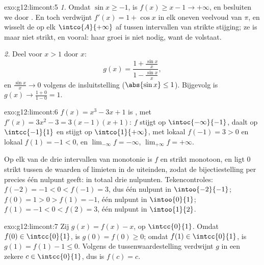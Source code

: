 \begin{solution}{exo:g12:limcont:5}
\emph{1.} Omdat $\sin x \geq -1$, is $f(x) \geq x - 1 \to +\infty$, en
besluiten we door . En toch verdwijnt $f'(x) = 1 + \cos x$ in elk
oneven veelvoud van $\pi$, en wisselt de  op elk 
$\intco{A}{+\infty}$ af tussen intervallen van strikte stijging; ze is
 maar niet strikt, en vooral: haar groei is niet nodig, want de
 volstaat.

\emph{2.} Deel voor $x > 1$ door $x$:
\[
g(x) = \frac{1 + \frac{\sin x}{x}}{1 - \frac{\sin x}{x}},
\]
en $\frac{\sin x}{x} \to 0$ volgens de insluitstelling
($\abs{\sin x} \leq 1$). Bijgevolg is $g(x) \to \frac{1+0}{1-0} = 1$.
\end{solution}

\begin{solution}{exo:g12:limcont:6}
$f(x) = x^3 - 3x + 1$ is , met $f'(x) = 3x^2 - 3 = 3(x-1)(x+1)$: $f$
stijgt op $\intoc{-\infty}{-1}$, daalt op $\intcc{-1}{1}$ en stijgt op
$\intco{1}{+\infty}$, met lokaal  $f(-1) = 3 > 0$ en lokaal 
$f(1) = -1 < 0$, en $\lim_{-\infty} f = -\infty$,
$\lim_{+\infty} f = +\infty$.

Op elk van de drie intervallen van monotonie is $f$  en strikt
monotoon, en ligt $0$ strikt tussen de waarden of limieten in de uiteinden,
zodat de bijectiestelling per  precies één nulpunt geeft: in totaal
drie nulpunten. Tekencontroles: $f(-2) = -1 < 0 < f(-1) = 3$, dus één nulpunt
in $\intoo{-2}{-1}$; $f(0) = 1 > 0 > f(1) = -1$, één nulpunt in
$\intoo{0}{1}$; $f(1) = -1 < 0 < f(2) = 3$, één nulpunt in $\intoo{1}{2}$.
\end{solution}

\begin{solution}{exo:g12:limcont:7}
Zij $g(x) = f(x) - x$,  op $\intcc{0}{1}$. Omdat
$f(0) \in \intcc{0}{1}$, is $g(0) = f(0) \geq 0$; omdat
$f(1) \in \intcc{0}{1}$, is $g(1) = f(1) - 1 \leq 0$. Volgens de
tussenwaardestelling verdwijnt $g$ in een zekere $c \in \intcc{0}{1}$, dus is
$f(c) = c$.
\end{solution}

